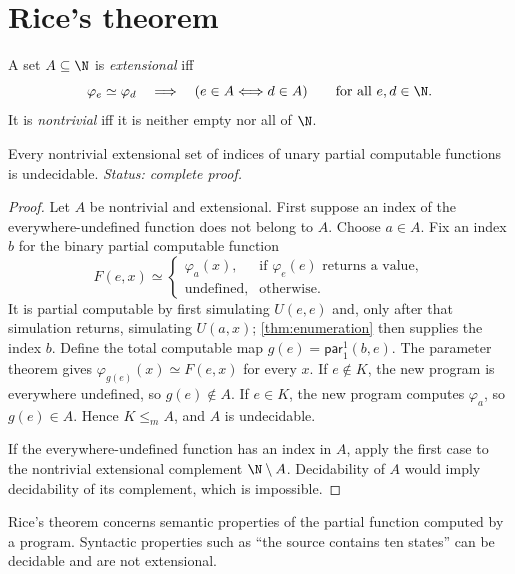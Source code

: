 \section{Rice's theorem}
\label{sec:universal-reductions-05}

\begin{definition}
A set \(A\subseteq\N\) is \emph{extensional} iff
\[
  \varphi_e\simeq\varphi_d
  \quad\Longrightarrow\quad
  (e\in A\Longleftrightarrow d\in A)
  \qquad\text{for all }e,d\in\N.
\]
It is \emph{nontrivial} iff it is neither empty nor all of \(\N\).
\end{definition}

\begin{theorem}[Rice]
\label{thm:rice}
Every nontrivial extensional set of indices of unary partial computable
functions is undecidable.
\textit{Status: complete proof.}
\end{theorem}

\begin{proof}
Let \(A\) be nontrivial and extensional.  First suppose an index of the
everywhere-undefined function does not belong to \(A\).  Choose \(a\in A\).
Fix an index \(b\) for the binary partial computable function
\[
 F(e,x)\simeq
 \begin{cases}
   \varphi_a(x),&\text{if }\varphi_e(e)\text{ returns a value},\\
   \text{undefined},&\text{otherwise}.
 \end{cases}
\]
It is partial computable by first simulating \(U(e,e)\) and, only after that
simulation returns, simulating \(U(a,x)\); \cref{thm:enumeration} then
supplies the index \(b\).  Define the total computable map
\(g(e)=\mathsf{par}_1^1(b,e)\).  The parameter theorem gives
\(\varphi_{g(e)}(x)\simeq F(e,x)\) for every \(x\).  If \(e\notin K\), the
new program is everywhere undefined, so \(g(e)\notin A\).  If \(e\in K\), the
new program computes \(\varphi_a\), so \(g(e)\in A\).  Hence
\(K\leq_m A\), and \(A\) is undecidable.

If the everywhere-undefined function has an index in \(A\), apply the first
case to the nontrivial extensional complement \(\N\setminus A\).  Decidability
of \(A\) would imply decidability of its complement, which is impossible.
\end{proof}

\begin{warning}
Rice's theorem concerns semantic properties of the partial function computed
by a program.  Syntactic properties such as ``the source contains ten states''
can be decidable and are not extensional.
\end{warning}

